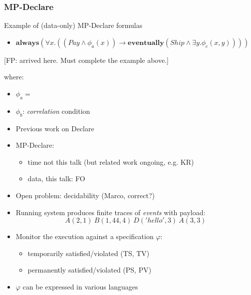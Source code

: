 \documentclass{beamer}
\newcommand{\always}{\mathbf{always}}
\newcommand{\eventually}{\mathbf{eventually}}
\begin{document}
\begin{frame}
\frametitle{MP-Declare}
Example of (data-only) MP-Declare formulas

\begin{itemize}
	\item $\always(\forall x.((Pay\land\phi_a(x)) \rightarrow \eventually (Ship \land\exists y.\phi_c(x, y))))$
\end{itemize}

[FP: arrived here. Must complete the example above.]


where:
\begin{itemize}
	\item $\phi_a=$
	\item $\phi_b$: \emph{correlation} condition
\end{itemize}


\begin{itemize}
	\item Previous work on Declare
	\item MP-Declare:
		\begin{itemize}
			\item time not this talk (but related work ongoing, e.g. KR)
			\item data, this talk: FO
		\end{itemize}
	\item Open problem: decidability (Marco, correct?)
\end{itemize}



\begin{itemize}
	\item Running system produces finite traces of \emph{events} with payload: 
	$$A(2,1)~B(1,44,4)~D('hello',3)~A(3,3)$$ 
	
	\item Monitor the execution against a specification $\varphi$:
		\begin{itemize}
			\item temporarily satisfied/violated (TS, TV)
			\item permanently satisfied/violated (PS, PV)
		\end{itemize}	
	
	\item $\varphi$ can be expressed in various languages
\end{itemize}



\end{frame}
\end{document}
